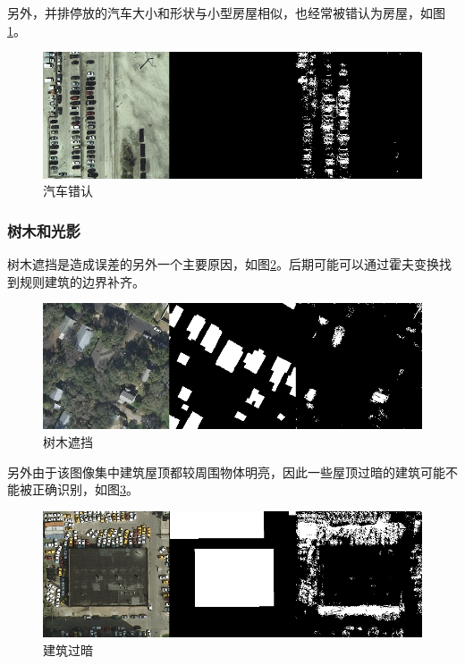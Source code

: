 另外，并排停放的汽车大小和形状与小型房屋相似，也经常被错认为房屋，如图\ref{Fig:error_car}。
\begin{figure}[htbp]
    
    \centering
    \includegraphics[width=1\textwidth]{Figures/错误/汽车错认.png}
    \caption{汽车错认}
    \label{Fig:error_car}
    
\end{figure}

\subsubsection{树木和光影}

树木遮挡是造成误差的另外一个主要原因，如图\ref{Fig:tree_error}。后期可能可以通过霍夫变换找到规则建筑的边界补齐。
\begin{figure}[htbp]
    
    \centering
    \includegraphics[width=1\textwidth]{Figures/错误/树木遮挡.png}
    \caption{树木遮挡}
    \label{Fig:tree_error}
    
\end{figure}

另外由于该图像集中建筑屋顶都较周围物体明亮，因此一些屋顶过暗的建筑可能不能被正确识别，如图\ref{Fig:dark_building}。
\begin{figure}[htbp]
    
    \centering
    \includegraphics[width=1\textwidth]{Figures/错误/建筑过暗.png}
    \caption{建筑过暗}
    \label{Fig:dark_building}
    
\end{figure}

